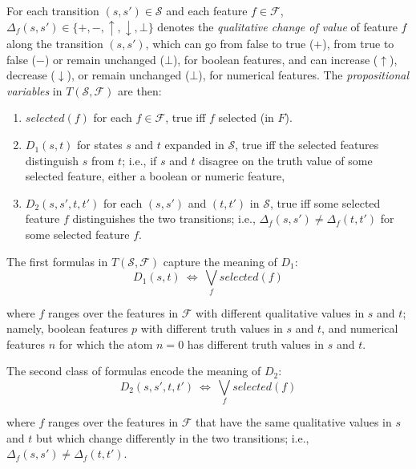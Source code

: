\documentclass[letterpaper]{article} %
\newcommand{\F}{\mathcal{F}}
\renewcommand{\S}{\mathcal{S}}
\begin{document}
For each transition  $(s, s') \in \S$ and each  feature $f \in \F$,
$\Delta_f(s, s') \in \{+, -, \uparrow, \downarrow, \bot\}$  denotes the
\emph{qualitative change of value} of feature $f$ along the transition $(s, s')$,
which can go from false to true ($+$), from true to false ($-$) or remain
unchanged ($\bot$), for boolean features, and can increase ($\uparrow$),
decrease ($\downarrow$), or remain unchanged ($\bot$), for numerical features.
The \emph{propositional variables} in $T(\S,\F)$ are then:
\begin{enumerate}[{\small$\bullet$}]
  \item $selected(f)$ for each $f \in \F$, true iff $f$ selected (in $F$).
  \item $D_1(s,t)$ for states $s$ and $t$ expanded in $\S$,  true iff the
    selected features distinguish $s$ from $t$; i.e., if $s$ and $t$ disagree
    on the truth value of some selected feature, either a boolean or numeric feature,
  \item $D_2(s, s', t, t')$ for each $(s, s')$ and $(t, t')$ in $\S$,
    true iff some selected feature $f$ distinguishes the two transitions; i.e.,
    $\Delta_f(s, s')\not=\Delta_f(t,t')$ for some selected feature $f$.
\end{enumerate}

\medskip
\noindent The first formulas in $T(\S,\F)$ capture the meaning of $D_1$:
%  
\begin{equation}
  \label{eq:d1}
  D_1(s, t) \ \Leftrightarrow\ \textstyle \bigvee_{f}  selected(f)
\end{equation}

\noindent where $f$ ranges over the features in $\F$ with  different qualitative
values in $s$ and $t$; namely, boolean features $p$ with different
truth values in $s$ and $t$, and numerical features $n$ for which 
the atom $n=0$ has different truth values in $s$ and $t$. 

The second class of formulas encode the meaning of $D_2$:
%
\begin{equation}
  \label{eq:d2}
  D_2(s, s', t, t') \ \Leftrightarrow\ \textstyle\bigvee_f  selected(f)
\end{equation}

\noindent where $f$ ranges over the features in $\F$ that have the same
qualitative values in $s$ and $t$ but which change differently in the two
transitions; i.e., $\Delta_f(s, s') \neq \Delta_f(t, t')$.
\end{document}
